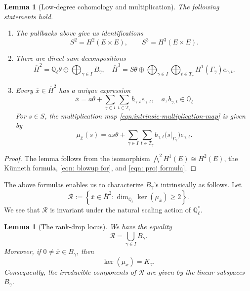 \documentclass[11pt, reqno]{amsart}
\newtheorem{lemma}[theorem]{Lemma}
\theoremstyle{definition}
\newcommand\QQ{\mathbb{Q}}
\begin{document}
\begin{lemma}[Low-degree cohomology and multiplication]
\label{lem:low-degree-multiplication}
The following statements hold.

\begin{enumerate}
    \item The pullbacks above give us identifications
    \[
    S^2=H^2(E\times E),
    \qquad
    S^3=H^3(E\times E).
    \]

    \item There are direct-sum decompositions
    \[
    \overline H^2
    =
    \QQ_\ell\theta\oplus
    \bigoplus_{\gamma\in I}B_\gamma,\quad 
    \overline H^3
    =
    S\theta\oplus
    \bigoplus_{\gamma\in I}
    \bigoplus_{t\in T_\gamma}
    H^1(\Gamma_\gamma)e_{\gamma,t}.
    \]

    \item Every $\overline{x}\in\overline H^2$ has a unique expression
    \begin{equation}
    \label{eqn: x bar}
        \overline{x}
    =
    a\theta+
    \sum_{\gamma\in I}
    \sum_{t\in T_\gamma}
    b_{\gamma,t}e_{\gamma,t}, \quad a,b_{\gamma,t}\in \QQ_\ell
    \end{equation}
    For $s\in S$, the multiplication map
    \eqref{eqn:intrinsic-multiplication-map} is given by
    \begin{equation}
    \label{eqn: muxbar}
    \mu_{\overline{x}}(s)
    =
    as\theta+
    \sum_{\gamma\in I}
    \sum_{t\in T_\gamma}
    b_{\gamma,t}
    \bigl(s|_{\Gamma_\gamma}\bigr)e_{\gamma,t}.
    \end{equation}
\end{enumerate}
\end{lemma}

\begin{proof}
The lemma follows from the isomorphism $\bigwedge^2H^1(E)\cong H^2(E)$, the K\"unneth formula, \eqref{eqn: blowup for}, and \eqref{eqn: proj formula}.
\end{proof}

The above formulas enables us to characterize $B_{\gamma}$'s intrinsically as follows. 
Let 
\[\mathscr R:=\left\{
\overline{x}\in\overline H^2:
\dim_{\QQ_\ell}\ker(\mu_{\overline{x}})\geq 2
\right\}.\]
We see that $\mathscr R$ is invariant under the natural scaling action of $\QQ_{\ell}^*$.

\begin{lemma}[The rank-drop locus]
\label{lem:rank-drop-cone}
We have the equality
\begin{equation}
\label{eqn:rank-drop-cone}
\mathscr R
=
\bigcup_{\gamma\in I}B_\gamma.
\end{equation}
Moreover, if $0\neq\overline{x}\in B_\gamma$, then
\begin{equation}
    \label{eqn: kerk}
    \ker(\mu_{\overline{x}})=K_\gamma.
\end{equation}
Consequently, the irreducible components of $\mathscr R$ are given by the linear subspaces $B_\gamma$.
\end{lemma}
\end{document}
